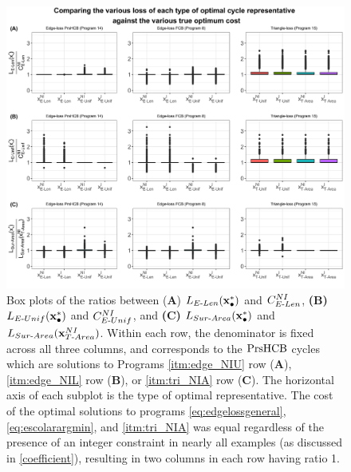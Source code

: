 \begin{figure}[h!]
\begin{center}
\includegraphics[width=\textwidth]{figures/length_area_edge.jpg}
\end{center}
\caption{Box plots of the ratios between (\textbf{A}) $L_{E\text{-}Len}(\mathbf{x}_\bullet^*)$ and $C_{E\text{-}Len}^{NI}$,  \textbf{(B)} $L_{E\text{-}Unif}(\mathbf{x}_\bullet^*)$ and $C_{E\text{-}Unif}^{NI}$, and  \textbf{(C)} $L_{Sur\text{-}Area}(\mathbf{x}_\bullet^*)$ and $L_{Sur\text{-}Area}(\mathbf{x} _{T\text{-}Area}^{NI})$. 
Within each row, the denominator is fixed across all three columns, and corresponds to the $\mathrm{PrsHCB}$ cycles which are solutions to Programs \ref{itm:edge_NIU} row (\textbf{A}), \ref{itm:edge_NIL} row (\textbf{B}), or \ref{itm:tri_NIA} row (\textbf{C}).
The horizontal axis of each subplot is the type of optimal representative.
The cost of the optimal solutions to programs
\pr \eqref{eq:edgelossgeneral}, \pr \eqref{eq:escolarargmin}, and \pr \ref{itm:tri_NIA} was equal regardless of the presence of an integer constraint in nearly all examples (as discussed in \se \ref{coefficient}), resulting in two columns in each row having ratio 1. 
}
\end{figure}
